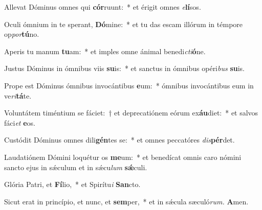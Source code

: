 \item Allevat Dóminus omnes qui \textbf{cór}ruunt:~* et érigit omnes \textit{e}\textbf{lí}sos.
\item Oculi ó\-mnium in te sperant, \textbf{Dó}mine:~* et tu das escam illórum in témpore op\teenyhspace\textit{por}\textbf{tú}no.
\item Aperis tu manum \textbf{tu}am:~* et imples omne ánimal benedi\tinyhspace\textit{cti}\textbf{ó}ne.
\item Justus Dóminus in ómnibus viis \textbf{su}is:~* et san\-ctus in ómnibus opéri\textit{bus} \textbf{su}is.
\item Prope est Dóminus ómnibus invocántibus \textbf{e}um:~* ómnibus invocántibus eum in ve\tinyhspace\textit{ri}\textbf{tá}te.
\item Voluntátem timéntium se fáciet:~† et deprecatiónem eórum ex\textbf{áu}diet:~* et salvos fáci\tinyhspace\textit{et} \textbf{e}os.
\item Custódit Dóminus omnes dili\textbf{gén}tes se:~* et omnes peccatóres \textit{dis}\textbf{pér}det.
\item Laudatiónem Dómini loquétur os \textbf{me}um:~* et benedícat omnis caro nómini sancto ejus in sǽculum et in sǽcu\tinyhspace\textit{lum} \textbf{sǽ}culi.
\item Glória Patri, et \textbf{Fí}lio,~* et Spirítu\tinyhspace\textit{i} \textbf{San}cto.
\item Sicut erat in princípio, et nunc, et \textbf{sem}per,~* et in sǽcula sæculó\textit{rum.} \textbf{A}men.